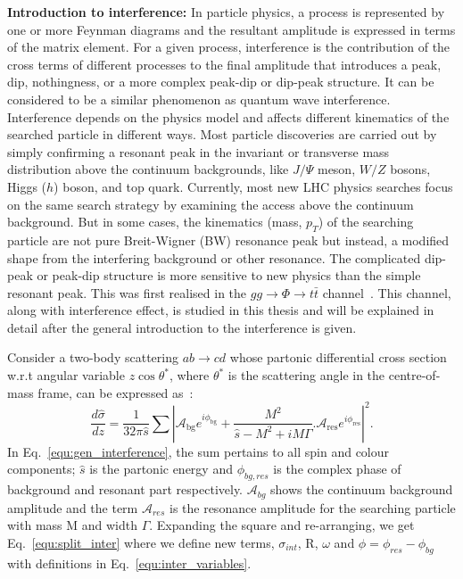 \textbf{Introduction to interference:} In particle physics, a process is represented by one or more Feynman diagrams and the resultant amplitude is expressed in terms of the matrix element. For a given process, interference is the contribution of the cross terms of different processes to the final amplitude that introduces a peak, dip, nothingness, or a more complex peak-dip or dip-peak structure. It can be considered to be a similar phenomenon as quantum wave interference. Interference depends on the physics model and affects different kinematics of the searched particle in different ways. Most particle discoveries are carried out by simply confirming a resonant peak in the invariant or transverse mass distribution above the continuum backgrounds, like $J/\Psi$ meson, $W/Z$ bosons, Higgs ($h$) boson, and top quark. Currently, most new LHC physics searches focus on the same search strategy by examining the access above the continuum background. But in some cases, the kinematics (mass, $p_{T}$) of the searching particle are not pure Breit-Wigner (BW) resonance peak but instead, a modified shape from the interfering background or other resonance. The complicated dip-peak or peak-dip structure is more sensitive to new physics than the simple resonant peak. This was first realised in the $gg\rightarrow\Phi\rightarrow t\bar{t}$ channel~\cite{Gaemers:1984}. This channel, along with interference effect, is studied in this thesis and will be explained in detail after the general introduction to the interference is given. 

Consider a two-body scattering $ab\rightarrow {cd}$ whose partonic differential cross section w.r.t angular variable $z\cos\theta^{*}$, where $\theta^{*}$ is the scattering angle in the centre-of-mass frame, can be expressed as~\cite{Jung:2015gta}:   
\begin{equation}\label{equ:gen_interference}
\frac{d\hat{\sigma}}{dz}=\frac{1}{32\pi\hat{s}}\sum \left| \mathcal{A}_{\text{bg}}e^{i\phi_{\text{bg}}}+\frac{M^{2}}{\hat{s}-M^{2}+iM\Gamma}.\mathcal{A}_{\text{res}}e^{i\phi_{\text{res}}} \right|^{2}.
\end{equation}
In Eq.~\ref{equ:gen_interference}, the sum pertains to all spin and colour components; $\hat{s}$ is the partonic energy and $\phi_{bg,res}$ is the complex phase of background and resonant part respectively. $\mathcal{A}_{bg}$ shows the continuum background amplitude and the term $\mathcal{A}_{res}$ is the resonance amplitude for the searching particle with mass M and width $\Gamma$. Expanding the square and re-arranging, we get Eq.~\ref{equ:split_inter} where we define new terms, $\sigma_{int}$, R, $\omega$ and $\phi = \phi_{res}-\phi_{bg}$ with definitions in Eq.~\ref{equ:inter_variables}.  

